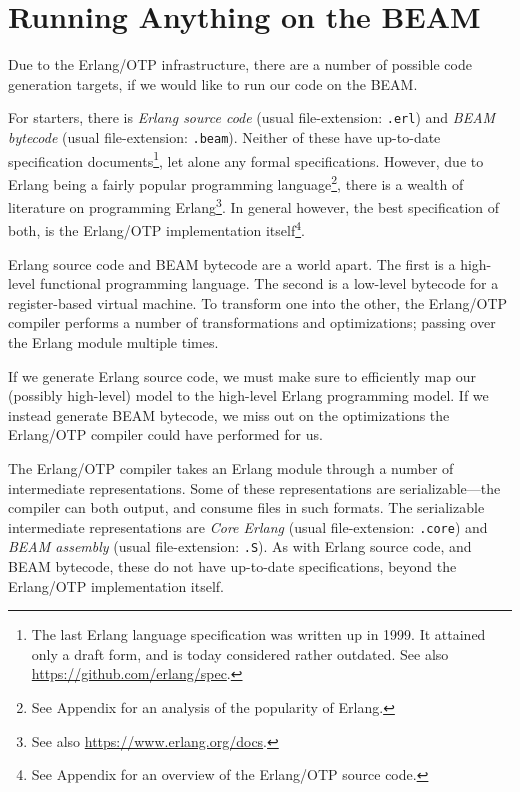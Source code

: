\section{Running Anything on the BEAM}

Due to the Erlang/OTP infrastructure, there are a number of possible
code generation targets, if we would like to run our code on the BEAM.

For starters, there is \emph{Erlang source code} (usual
file-extension: \texttt{.erl}) and \emph{BEAM bytecode} (usual
file-extension: \texttt{.beam}). Neither of these have up-to-date
specification documents\footnote{The last Erlang language
specification was written up in 1999\cite{erlang:1999:spec}. It
attained only a draft form, and is today considered rather outdated.
See also \url{https://github.com/erlang/spec}.}, let alone any formal
specifications. However, due to Erlang being a fairly popular
programming language\footnote{See Appendix
 for an analysis of the popularity
of Erlang.}, there is a wealth of literature on programming
Erlang\footnote{See also \url{https://www.erlang.org/docs}.}.  In
general however, the best specification of both, is the Erlang/OTP
implementation itself\footnote{See Appendix
 for an overview of the
Erlang/OTP source code.}.

Erlang source code and BEAM bytecode are a world apart. The first is a
high-level functional programming language. The second is a low-level
bytecode for a register-based virtual machine. To transform one into
the other, the Erlang/OTP compiler performs a number of
transformations and optimizations; passing over the Erlang module
multiple times.

If we generate Erlang source code, we must make sure to efficiently
map our (possibly high-level) model to the high-level Erlang
programming model. If we instead generate BEAM bytecode, we miss out
on the optimizations the Erlang/OTP compiler could have performed for
us.

The Erlang/OTP compiler takes an Erlang module through a number of
intermediate representations. Some of these representations are
serializable---the compiler can both output, and consume files in such
formats. The serializable intermediate representations are \emph{Core
Erlang} (usual file-extension: \texttt{.core}) and \emph{BEAM
assembly} (usual file-extension: \texttt{.S}). As with Erlang
source code, and BEAM bytecode, these do not have up-to-date
specifications, beyond the Erlang/OTP implementation itself.

